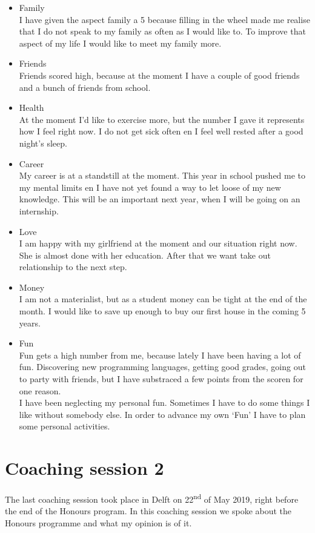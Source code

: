 \documentclass{article}
\begin{document}
\begin{itemize}
	\item Family\\
	I have given the aspect family a 5 because filling in the wheel made me realise that I do not speak to my family as often as I would like to. To improve that aspect of my life I would like to meet my family more.
	\item Friends\\
	Friends scored high, because at the moment I have a couple of good friends and a bunch of friends from school.
	\item Health\\
	At the moment I'd like to exercise more, but the number I gave it represents how I feel right now. I do not get sick often en I feel well rested after a good night's sleep.
	\item Career\\
	My career is at a standstill at the moment. This year in school pushed me to my mental limits en I have not yet found a way to let loose of my new knowledge. This will be an important next year, when I will be going on an internship.
	\item Love\\
	I am happy with my girlfriend at the moment and our situation right now. She is almost done with her education. After that we want take out relationship to the next step.
	\item Money\\
	I am not a materialist, but as a student money can be tight at the end of the month. I would like to save up enough to buy our first house in the coming 5 years.
	\item Fun\\
	Fun gets a high number from me, because lately I have been having a lot of fun. Discovering new programming languages, getting good grades, going out to party with friends, but I have substraced a few points from the scoren for one reason.\\
	
	I have been neglecting my personal fun. Sometimes I have to do some things I like without somebody else. In order to advance my own `Fun' I have to plan some personal activities. 
\end{itemize}





\section{Coaching session 2}
The last coaching session took place in Delft on 22\textsuperscript{nd} of May 2019, right before the end of the Honours program. In this coaching session we spoke about the Honours programme and what my opinion is of it.\\
\end{document}
